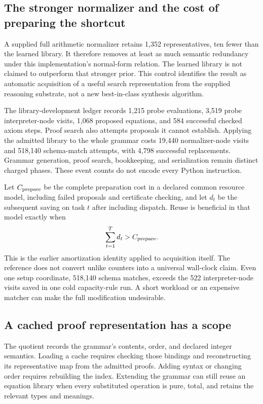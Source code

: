 \subsection{The stronger normalizer and the cost of preparing the shortcut}
A supplied full arithmetic normalizer retains 1,352 representatives, ten fewer than the learned library. It therefore removes at least as much semantic redundancy under this implementation's normal-form relation. The learned library is not claimed to outperform that stronger prior. This control identifies the result as automatic acquisition of a useful search representation from the supplied reasoning substrate, not a new best-in-class synthesis algorithm.

The library-development ledger records 1,215 probe evaluations, 3,519 probe interpreter-node visits, 1,068 proposed equations, and 584 successful checked axiom steps. Proof search also attempts proposals it cannot establish. Applying the admitted library to the whole grammar costs 19,440 normalizer-node visits and 518,140 schema-match attempts, with 4,798 successful replacements. Grammar generation, proof search, bookkeeping, and serialization remain distinct charged phases. These event counts do not encode every Python instruction.

Let $C_{\rm prepare}$ be the complete preparation cost in a declared common resource model, including failed proposals and certificate checking, and let $d_t$ be the subsequent saving on task $t$ after including dispatch. Reuse is beneficial in that model exactly when
\[
 \sum_{t=1}^{T}d_t>C_{\rm prepare}.
\]
This is the earlier amortization identity applied to acquisition itself. The reference does not convert unlike counters into a universal wall-clock claim. Even one setup coordinate, 518,140 schema matches, exceeds the 522 interpreter-node visits saved in one cold capacity-rule run. A short workload or an expensive matcher can make the full modification undesirable.

\subsection{A cached proof representation has a scope}
The quotient records the grammar's contents, order, and declared integer semantics. Loading a cache requires checking those bindings and reconstructing its representative map from the admitted proofs. Adding syntax or changing order requires rebuilding the index. Extending the grammar can still reuse an equation library when every substituted operation is pure, total, and retains the relevant types and meanings.

